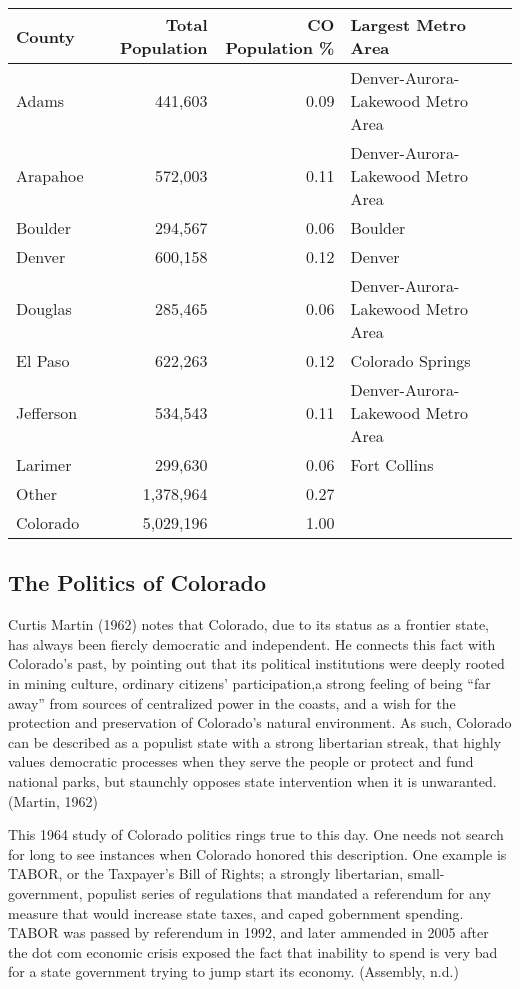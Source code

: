\documentclass[12pt,twoside]{reedthesis}
\begin{document}
  \begin{longtable}[]{@{}lrrl@{}}
  \toprule
  County & Total Population & CO Population \% & Largest Metro
  Area\tabularnewline
  \midrule
  \endhead
  Adams & 441,603 & 0.09 & Denver-Aurora-Lakewood Metro
  Area\tabularnewline
  Arapahoe & 572,003 & 0.11 & Denver-Aurora-Lakewood Metro
  Area\tabularnewline
  Boulder & 294,567 & 0.06 & Boulder\tabularnewline
  Denver & 600,158 & 0.12 & Denver\tabularnewline
  Douglas & 285,465 & 0.06 & Denver-Aurora-Lakewood Metro
  Area\tabularnewline
  El Paso & 622,263 & 0.12 & Colorado Springs\tabularnewline
  Jefferson & 534,543 & 0.11 & Denver-Aurora-Lakewood Metro
  Area\tabularnewline
  Larimer & 299,630 & 0.06 & Fort Collins\tabularnewline
  Other & 1,378,964 & 0.27 &\tabularnewline
  Colorado & 5,029,196 & 1.00 &\tabularnewline
  \bottomrule
  \end{longtable}
  
  \subsection{The Politics of Colorado}\label{the-politics-of-colorado}
  
  Curtis Martin (1962) notes that Colorado, due to its status as a
  frontier state, has always been fiercly democratic and independent. He
  connects this fact with Colorado's past, by pointing out that its
  political institutions were deeply rooted in mining culture, ordinary
  citizens' participation,a strong feeling of being ``far away'' from
  sources of centralized power in the coasts, and a wish for the
  protection and preservation of Colorado's natural environment. As such,
  Colorado can be described as a populist state with a strong libertarian
  streak, that highly values democratic processes when they serve the
  people or protect and fund national parks, but staunchly opposes state
  intervention when it is unwaranted. (Martin, 1962)
  
  This 1964 study of Colorado politics rings true to this day. One needs
  not search for long to see instances when Colorado honored this
  description. One example is TABOR, or the Taxpayer's Bill of Rights; a
  strongly libertarian, small-government, populist series of regulations
  that mandated a referendum for any measure that would increase state
  taxes, and caped gobernment spending. TABOR was passed by referendum in
  1992, and later ammended in 2005 after the dot com economic crisis
  exposed the fact that inability to spend is very bad for a state
  government trying to jump start its economy. (Assembly, n.d.)
  
\end{document}
